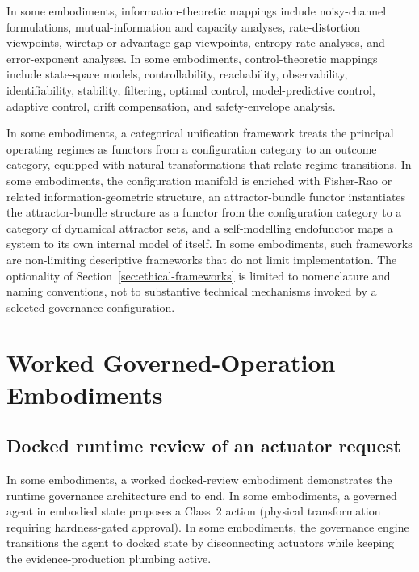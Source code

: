 \documentclass[a4paper,12pt]{article}
\begin{document}
In some embodiments, information-theoretic mappings include
noisy-channel formulations, mutual-information and capacity analyses,
rate-distortion viewpoints, wiretap or advantage-gap viewpoints,
entropy-rate analyses, and error-exponent analyses. In some
embodiments, control-theoretic mappings include state-space models,
controllability, reachability, observability, identifiability,
stability, filtering, optimal control, model-predictive control,
adaptive control, drift compensation, and safety-envelope analysis.

In some embodiments, a categorical unification framework treats the
principal operating regimes as functors from a configuration category
to an outcome category, equipped with natural transformations that
relate regime transitions. In some embodiments, the configuration
manifold is enriched with Fisher-Rao or related information-geometric
structure, an attractor-bundle functor instantiates the
attractor-bundle structure as a functor from the configuration
category to a category of dynamical attractor sets, and a
self-modelling endofunctor maps a system to its own internal model of
itself. In some embodiments, such frameworks are non-limiting descriptive
frameworks that do not limit implementation. The optionality of
Section~\ref{sec:ethical-frameworks} is limited to nomenclature
and naming conventions, not to substantive technical mechanisms
invoked by a selected governance configuration.

\section{Worked Governed-Operation Embodiments}


\subsection{Docked runtime review of an actuator request}

In some embodiments, a worked docked-review embodiment demonstrates
the runtime governance architecture end to end. In some embodiments,
a governed agent in embodied state proposes a Class~2 action (physical
transformation requiring hardness-gated approval). In some
embodiments, the governance engine transitions the agent to docked
state by disconnecting actuators while keeping the evidence-production
plumbing active.
\end{document}
